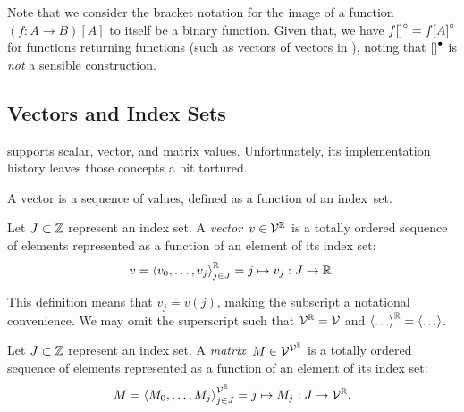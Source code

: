 Note that we consider the bracket notation for the image of a function
  $(f:A\rightarrow B)[A]$ to itself be a binary function.
Given that, we have $f{[]}^\circ = f{[A]}^\circ$ for functions returning
  functions (such as vectors of vectors in ),
    noting that ${[]}^\bullet$ is \emph{not} a sensible construction.


\goodbreak%
\subsection{Vectors and Index Sets}
\tame{} supports scalar, vector, and matrix values.
Unfortunately,
  its implementation history leaves those concepts a bit tortured.

A vector is a sequence of values, defined as a function of
  an index~set.

\indexsym{}
\indexsym{}
\begin{definition}[Vector]
  Let $J\subset\mathbb{Z}$ represent an index set.
  A \emph{vector}~$v\in\mathcal{V}^{\mathbb{R}}$ is a totally ordered sequence of
   elements represented as a function of an element of its index set:
  \begin{equation}\label{vec}
    v = \left\langle v_0,\ldots,v_j\right\rangle^{\mathbb{R}}_{j\in J}
      = j \mapsto v_j : J \rightarrow \mathbb{R}.
  \end{equation}
\end{definition}

This definition means that $v_j = v(j)$,
  making the subscript a notational convenience.
We may omit the superscript such that $\mathcal{V}^{\mathbb{R}}=\mathcal{V}$
  and $\left\langle\ldots\right\rangle^{\mathbb{R}}=\left\langle\ldots\right\rangle$.

\begin{definition}[Matrix]
  Let $J\subset\mathbb{Z}$ represent an index set.
  A \emph{matrix}~$M\in\mathcal{V}^{\mathcal{V}^{\mathbb{R}}}$ is a totally ordered sequence of
   elements represented as a function of an element of its index set:
  \begin{equation}
    M = \left\langle M_0,\ldots,M_j\right\rangle^{\mathcal{V}^{\mathbb{R}}}_{j\in J}
      = j \mapsto M_j : J \rightarrow \mathcal{V}^{\mathbb{R}}.
  \end{equation}
\end{definition}

